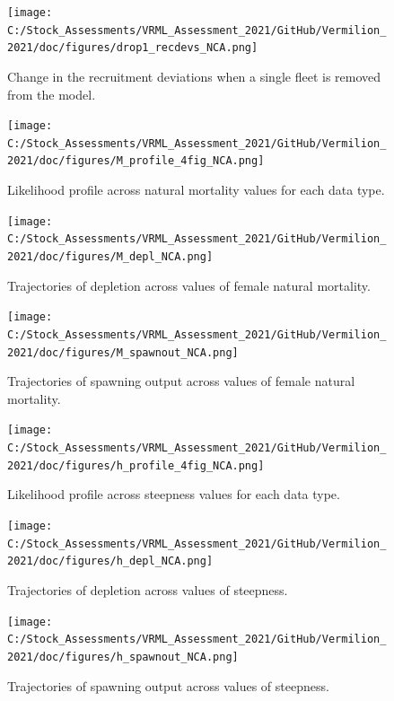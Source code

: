 \documentclass[
  english,
  a4paper,
]{article}
\begin{document}
\begin{figure}
\centering
\texttt{[image: C:/Stock\_Assessments/VRML\_Assessment\_2021/GitHub/Vermilion\_2021/doc/figures/drop1\_recdevs\_NCA.png]}
\caption{Change in the recruitment deviations when a single fleet is removed from the model.\label{fig:drop-recdev}}
\end{figure}

\begin{figure}
\centering
\texttt{[image: C:/Stock\_Assessments/VRML\_Assessment\_2021/GitHub/Vermilion\_2021/doc/figures/M\_profile\_4fig\_NCA.png]}
\caption{Likelihood profile across natural mortality values for each data type.\label{fig:m-profile}}
\end{figure}

\begin{figure}
\centering
\texttt{[image: C:/Stock\_Assessments/VRML\_Assessment\_2021/GitHub/Vermilion\_2021/doc/figures/M\_depl\_NCA.png]}
\caption{Trajectories of depletion across values of female natural mortality.\label{fig:m-depl}}
\end{figure}

\begin{figure}
\centering
\texttt{[image: C:/Stock\_Assessments/VRML\_Assessment\_2021/GitHub/Vermilion\_2021/doc/figures/M\_spawnout\_NCA.png]}
\caption{Trajectories of spawning output across values of female natural mortality.\label{fig:m-spawn}}
\end{figure}

\begin{figure}
\centering
\texttt{[image: C:/Stock\_Assessments/VRML\_Assessment\_2021/GitHub/Vermilion\_2021/doc/figures/h\_profile\_4fig\_NCA.png]}
\caption{Likelihood profile across steepness values for each data type.\label{fig:h-profile}}
\end{figure}

\begin{figure}
\centering
\texttt{[image: C:/Stock\_Assessments/VRML\_Assessment\_2021/GitHub/Vermilion\_2021/doc/figures/h\_depl\_NCA.png]}
\caption{Trajectories of depletion across values of steepness.\label{fig:h-depl}}
\end{figure}

\begin{figure}
\centering
\texttt{[image: C:/Stock\_Assessments/VRML\_Assessment\_2021/GitHub/Vermilion\_2021/doc/figures/h\_spawnout\_NCA.png]}
\caption{Trajectories of spawning output across values of steepness.\label{fig:h-spawn}}
\end{figure}
\end{document}
